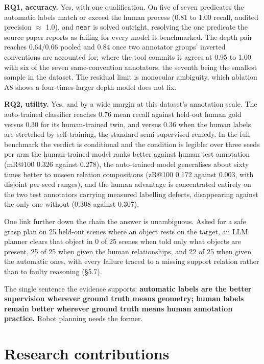 \textbf{RQ1, accuracy.} Yes, with one qualification. On five of seven predicates the automatic labels match or exceed the human process (0.81 to 1.00 recall, audited precision $\approx$ 1.0), and \texttt{near} is solved outright, resolving the one predicate the source paper reports as failing for every model it benchmarked. The depth pair reaches 0.64/0.66 pooled and 0.84 once two annotator groups' inverted conventions are accounted for; where the tool commits it agrees at 0.95 to 1.00 with six of the seven same-convention annotators, the seventh being the smallest sample in the dataset. The residual limit is monocular ambiguity, which ablation A8 shows a four-times-larger depth model does not fix.

\textbf{RQ2, utility.} Yes, and by a wide margin at this dataset's annotation scale. The auto-trained classifier reaches 0.76 mean recall against held-out human gold versus 0.30 for its human-trained twin, and versus 0.36 when the human labels are stretched by self-training, the standard semi-supervised remedy. In the full benchmark the verdict is conditional and the condition is legible: over three seeds per arm the human-trained model ranks better against human test annotation (mR@100 0.326 against 0.278), the auto-trained model generalises about sixty times better to unseen relation compositions (zR@100 0.172 against 0.003, with disjoint per-seed ranges), and the human advantage is concentrated entirely on the two test annotators carrying measured labelling defects, disappearing against the only one without (0.308 against 0.307).

One link further down the chain the answer is unambiguous. Asked for a safe grasp plan on 25 held-out scenes where an object rests on the target, an LLM planner clears that object in 0 of 25 scenes when told only what objects are present, 25 of 25 when given the human relationships, and 22 of 25 when given the automatic ones, with every failure traced to a missing support relation rather than to faulty reasoning (\S5.7).

The single sentence the evidence supports: \textbf{automatic labels are the better supervision wherever ground truth means geometry; human labels remain better wherever ground truth means human annotation practice.} Robot planning needs the former.

\section{Research contributions}

